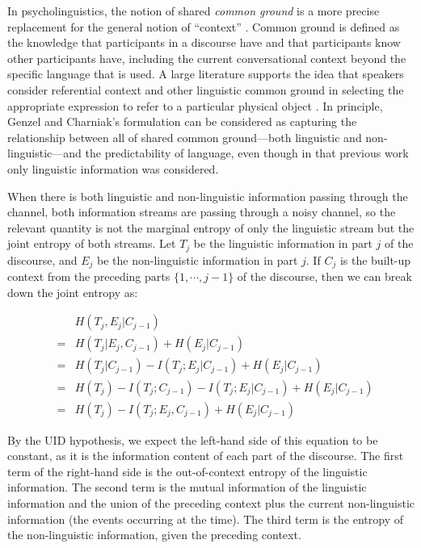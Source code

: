 \documentclass[11pt,letterpaper]{article}
\begin{document}
In psycholinguistics, the notion of shared \emph{common ground} is a more precise replacement for the general notion of ``context'' \cite{clark1996}. Common ground is defined as the knowledge that participants in a discourse have and that participants know other participants have, including the current conversational context beyond the specific language that is used. A large literature supports the idea that speakers consider referential context and other linguistic common ground in selecting the appropriate expression to refer to a particular physical object \cite{brennan1996,metzing2003,dale1995,sedivy1999}. In principle, Genzel and Charniak's formulation can be considered as capturing the relationship between all of shared common ground---both linguistic and non-linguistic---and the predictability of language, even though in that previous work only linguistic information was considered. 

When there is both linguistic and non-linguistic information passing through the channel, both information streams are passing through a noisy channel, so the relevant quantity is not the marginal entropy of only the linguistic stream but the joint entropy of both streams.  Let $T_j$ be the linguistic information in part $j$ of the discourse, and $E_j$ be the non-linguistic information in part $j$.  If $C_j$ is the built-up context from the preceding parts $\{1,\cdots,j-1\}$ of the discourse, then we can break down the joint entropy as:

\begin{eqnarray}
\nonumber &&H(T_j,E_j|C_{j-1}) \\
&=& H(T_j|E_j,C_{j-1}) + H(E_j|C_{j-1}) \\
\nonumber                    &=& H(T_j|C_{j-1}) - I(T_j;E_j|C_{j-1}) + H(E_j|C_{j-1}) \\
\nonumber                    &=& H(T_j) - I(T_j;C_{j-1}) - I(T_j;E_j|C_{j-1}) + H(E_j|C_{j-1}) \\
\label{eq:joint-entropy}     &=& H(T_j) - I(T_j;E_j,C_{j-1}) + H(E_j|C_{j-1})
\end{eqnarray}

By the UID hypothesis, we expect the left-hand side of this equation to be constant, as it is the information content of each part of the discourse.  The first term of the right-hand side is the out-of-context entropy of the linguistic information. The second term is the mutual information of the linguistic information and the union of the preceding context plus the current non-linguistic information (the events occurring at the time).  The third term is the entropy of the non-linguistic information, given the preceding context.
\end{document}

